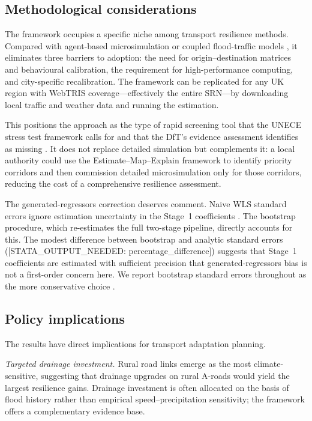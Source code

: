 \documentclass[review]{elsarticle}
\begin{document}
\subsection{Methodological considerations}
\label{sec:disc:method}

The framework occupies a specific niche among transport resilience methods. Compared with agent-based microsimulation \citep{huang2022overview,he2026flood} or coupled flood-traffic models \citep{pregnolato2017depth,pregnolato2016impact,farahmand2024integrating}, it eliminates three barriers to adoption: the need for origin--destination matrices and behavioural calibration, the requirement for high-performance computing, and city-specific recalibration. The framework can be replicated for any UK region with WebTRIS coverage---effectively the entire SRN---by downloading local traffic and weather data and running the estimation.

This positions the approach as the type of rapid screening tool that the UNECE stress test framework calls for \citep{unece2024stress} and that the DfT's evidence assessment identifies as missing \citep{dft2024rea}. It does not replace detailed simulation but complements it: a local authority could use the Estimate--Map--Explain framework to identify priority corridors and then commission detailed microsimulation only for those corridors, reducing the cost of a comprehensive resilience assessment.

The generated-regressors correction deserves comment. Naive WLS standard errors ignore estimation uncertainty in the Stage~1 coefficients \citep{pagan1984econometric}. The bootstrap procedure, which re-estimates the full two-stage pipeline, directly accounts for this. The modest difference between bootstrap and analytic standard errors ([STATA\_OUTPUT\_NEEDED: percentage\_difference]) suggests that Stage~1 coefficients are estimated with sufficient precision that generated-regressors bias is not a first-order concern here. We report bootstrap standard errors throughout as the more conservative choice \citep{murphy1985estimation}.

\subsection{Policy implications}
\label{sec:disc:policy}

The results have direct implications for transport adaptation planning.

\textit{Targeted drainage investment.} Rural road links emerge as the most climate-sensitive, suggesting that drainage upgrades on rural A-roads would yield the largest resilience gains. Drainage investment is often allocated on the basis of flood history rather than empirical speed--precipitation sensitivity; the framework offers a complementary evidence base.
\end{document}
